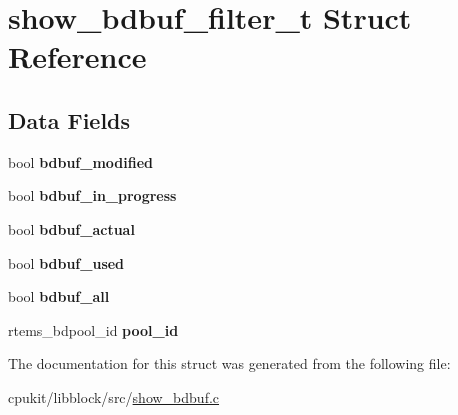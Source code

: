 \hypertarget{structshow__bdbuf__filter__t}{}\section{show\+\_\+bdbuf\+\_\+filter\+\_\+t Struct Reference}
\label{structshow__bdbuf__filter__t}
\subsection*{Data Fields}
\begin{DoxyCompactItemize}
\item 
\mbox{\label{structshow__bdbuf__filter__t_a7158740f7bfb5790e806545f1d6e39c6}} 
bool {\bfseries bdbuf\+\_\+modified}
\item 
\mbox{\label{structshow__bdbuf__filter__t_af7ecce7c62082989b0b5c247a3c6a446}} 
bool {\bfseries bdbuf\+\_\+in\+\_\+progress}
\item 
\mbox{\label{structshow__bdbuf__filter__t_ac5fe2ee1d5be6dead9ba89443ea9935b}} 
bool {\bfseries bdbuf\+\_\+actual}
\item 
\mbox{\label{structshow__bdbuf__filter__t_a8a05b0fda676180ea88ff7b88ebf7545}} 
bool {\bfseries bdbuf\+\_\+used}
\item 
\mbox{\label{structshow__bdbuf__filter__t_acaa28168a895a3830f00a33c4708cbdb}} 
bool {\bfseries bdbuf\+\_\+all}
\item 
\mbox{\label{structshow__bdbuf__filter__t_a1c473d67c0a8a3782c5f0d925dfcaf47}} 
rtems\+\_\+bdpool\+\_\+id {\bfseries pool\+\_\+id}
\end{DoxyCompactItemize}


The documentation for this struct was generated from the following file\+:\begin{DoxyCompactItemize}
\item 
cpukit/libblock/src/\mbox{\hyperlink{show__bdbuf_8c}{show\+\_\+bdbuf.\+c}}\end{DoxyCompactItemize}
